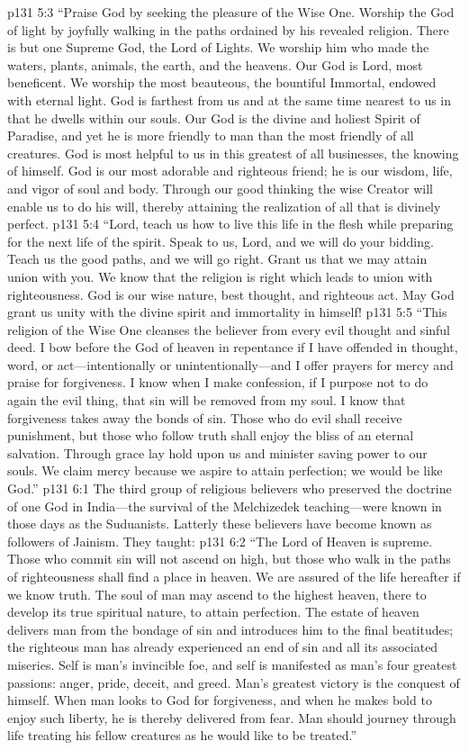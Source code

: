 \vs p131 5:3 “Praise God by seeking the pleasure of the Wise One. Worship the God of light by joyfully walking in the paths ordained by his revealed religion. There is but one Supreme God, the Lord of Lights. We worship him who made the waters, plants, animals, the earth, and the heavens. Our God is Lord, most beneficent. We worship the most beauteous, the bountiful Immortal, endowed with eternal light. God is farthest from us and at the same time nearest to us in that he dwells within our souls. Our God is the divine and holiest Spirit of Paradise, and yet he is more friendly to man than the most friendly of all creatures. God is most helpful to us in this greatest of all businesses, the knowing of himself. God is our most adorable and righteous friend; he is our wisdom, life, and vigor of soul and body. Through our good thinking the wise Creator will enable us to do his will, thereby attaining the realization of all that is divinely perfect.
\vs p131 5:4 “Lord, teach us how to live this life in the flesh while preparing for the next life of the spirit. Speak to us, Lord, and we will do your bidding. Teach us the good paths, and we will go right. Grant us that we may attain union with you. We know that the religion is right which leads to union with righteousness. God is our wise nature, best thought, and righteous act. May God grant us unity with the divine spirit and immortality in himself!
\vs p131 5:5 “This religion of the Wise One cleanses the believer from every evil thought and sinful deed. I bow before the God of heaven in repentance if I have offended in thought, word, or act---intentionally or unintentionally---and I offer prayers for mercy and praise for forgiveness. I know when I make confession, if I purpose not to do again the evil thing, that sin will be removed from my soul. I know that forgiveness takes away the bonds of sin. Those who do evil shall receive punishment, but those who follow truth shall enjoy the bliss of an eternal salvation. Through grace lay hold upon us and minister saving power to our souls. We claim mercy because we aspire to attain perfection; we would be like God.”\plusone
{}
\vs p131 6:1 The third group of religious believers who preserved the doctrine of one God in India---the survival of the Melchizedek teaching---were known in those days as the Suduanists. Latterly these believers have become known as followers of Jainism. They taught:
\pc \vs p131 6:2 “The Lord of Heaven is supreme. Those who commit sin will not ascend on high, but those who walk in the paths of righteousness shall find a place in heaven. We are assured of the life hereafter if we know truth. The soul of man may ascend to the highest heaven, there to develop its true spiritual nature, to attain perfection. The estate of heaven delivers man from the bondage of sin and introduces him to the final beatitudes; the righteous man has already experienced an end of sin and all its associated miseries. Self is man’s invincible foe, and self is manifested as man’s four greatest passions: anger, pride, deceit, and greed. Man’s greatest victory is the conquest of himself. When man looks to God for forgiveness, and when he makes bold to enjoy such liberty, he is thereby delivered from fear. Man should journey through life treating his fellow creatures as he would like to be treated.”\plusone
